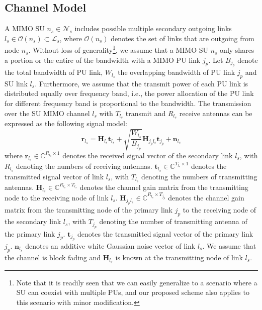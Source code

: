 \documentclass[12pt,onecolumn,tworows]{IEEEtran}
\begin{document}
\subsection{ Channel Model}
A MIMO SU $n_s \in {\mathcal{N} }_s$ includes possible multiple secondary outgoing links  ${l_s} \in \mathcal{O}\left( {{n_s}} \right)\subset{\mathcal{L}}_s$, where $\mathcal{O}({n_s})$ denotes the set of links that are outgoing from node ${n_s}$.
Without loss of
generality\footnote{Note that it is readily seen that we can easily generalize to a scenario where a SU can coexist with multiple PUs, and our proposed scheme also applies to this scenario with minor modification.}, we assume that a MIMO SU $n_s$ only shares a portion or the entire of the bandwidth with a MIMO PU link $j_p$.
Let $B_{{j_p}}$ denote the total bandwidth of PU link,
${W_{{l_s}}}$  the overlapping bandwidth of PU link ${j_p}$ and SU link ${l_s}$.
Furthermore, we assume that the transmit power of each PU link is distributed equally over frequency band, i.e., the power allocation of the PU link for different frequency band is proportional to the bandwidth. The transmission over the SU MIMO channel ${l_s}$ with ${T_{{l_s}}}$ transmit and ${R_{{l_s}}}$ receive antennas can be expressed as the following signal model:
\begin{equation}\label{1}
{{\mathbf{r}}_{{l_s}}} = {{\mathbf{H}}_{{l_s}}}{{\mathbf{t}}_{{l_s}}} + \sqrt{\frac{W_{l_s}}{B_{j_p}}}\mathbf{H}_{j_pl_s}\mathbf{t}_{j_p} + {{\mathbf{n}}_{{l_s}}}
\end{equation}
where ${{\mathbf{r}}_{{l_s}}}\in {\mathbb{C}}^{{R_{{l_s}}} \times 1}$ denotes the received signal vector of the secondary link ${l_s}$, with ${R_{{l_s}}}$ denoting the numbers of receiving antennas. ${{\mathbf{t}}_{{l_s}}}\in {\mathbb{C}}^{{T_{{l_s}}} \times 1}$ denotes the transmitted signal vector of  link ${l_s}$, with ${T_{{l_s}}}$ denoting the numbers of transmitting antennas.
${{\mathbf{H}}_{{l_s}}} \in {\mathbb{C}^{{R_{{l_s}}} \times {T_{{l_s}}}}}$ denotes the channel gain matrix from the transmitting node to the receiving node of link ${l_s}$.
$\mathbf{H}_{j_pl_s} \in {\mathbb{C}^{{R_{{l_s}}} \times {T_{{j_p}}}}}$
denotes the channel gain matrix from the transmitting node of the primary link $j_p$ to the receiving node of the secondary link ${l_s}$, with ${T_{{j_p}}}$ denoting the number of transmitting antenna of the primary link $j_p$.
$\mathbf{t}_{j_p}$ denotes the transmitted signal vector of the primary link ${j_p}$. ${{\mathbf{n}}_{{l_s}}}$ denotes an additive white Gaussian noise vector of link $l_s$. We assume that the channel is block fading and ${{\mathbf{H}}_{{l_s}}}$ is known at the transmitting node of link ${l_s}$.
\end{document}
